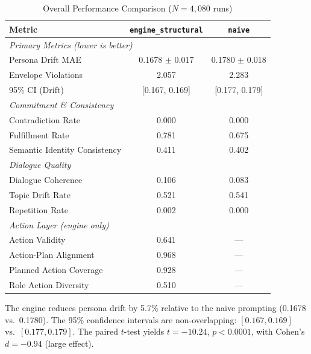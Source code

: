 \documentclass[12pt, a4paper]{report}
\newcommand{\engine}{\texttt{engine\_structural}}
\newcommand{\naive}{\texttt{naive}}
\begin{document}
\begin{table}[t]
\centering
\caption{Overall Performance Comparison ($N = 4{,}080$ runs)}
\label{tab:overall}
\begin{tabular}{lcc}
\toprule
Metric & \engine & \naive \\
\midrule
\multicolumn{3}{l}{\textit{Primary Metrics (lower is better)}} \\
Persona Drift MAE       & \cellcolor{better} 0.1678 $\pm$ 0.017 & 0.1780 $\pm$ 0.018 \\
Envelope Violations     & \cellcolor{better} 2.057              & 2.283 \\
95\% CI (Drift)         & \cellcolor{better} [0.167, 0.169]     & [0.177, 0.179] \\
\midrule
\multicolumn{3}{l}{\textit{Commitment \& Consistency}} \\
Contradiction Rate      & 0.000                       & 0.000 \\
Fulfillment Rate        & \cellcolor{better} 0.781    & 0.675 \\
Semantic Identity Consistency & \cellcolor{better} 0.411    & 0.402 \\
\midrule
\multicolumn{3}{l}{\textit{Dialogue Quality}} \\
Dialogue Coherence      & \cellcolor{better} 0.106    & 0.083 \\
Topic Drift Rate        & \cellcolor{better} 0.521    & 0.541 \\
Repetition Rate         & 0.002                       & \cellcolor{better} 0.000 \\
\midrule
\multicolumn{3}{l}{\textit{Action Layer (engine only)}} \\
Action Validity         & 0.641                       & --- \\
Action-Plan Alignment   & 0.968                       & --- \\
Planned Action Coverage & 0.928                       & --- \\
Role Action Diversity   & 0.510                       & --- \\
\bottomrule
\end{tabular}
\end{table}

The engine reduces persona drift by 5.7\% relative to the naive prompting (0.1678 vs.\ 0.1780). The 95\% confidence intervals are non-overlapping: $[0.167, 0.169]$ vs.\ $[0.177, 0.179]$. The paired $t$-test yields $t = -10.24$, $p < 0.0001$, with Cohen's $d = -0.94$ (large effect).
\end{document}
